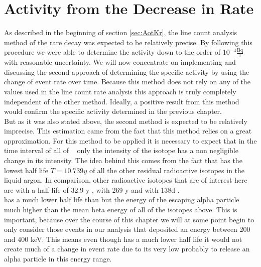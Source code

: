\documentclass[encoding=utf8,british]{tumphthesis}
\begin{document}
\chapter{Activity from the Decrease in Rate}
\label{sec:SAfromDecrease}

As described in the beginning of section \ref{sec:AotKr}, the line count analysis method of the rare \Kr decay was expected to be relatively precise.
By following this procedure we were able to determine the activity down to the order of 10$^{-4} \frac{\mathrm{Bq}}{\mathrm{l}}$ with reasonable uncertainty.
We will now concentrate on implementing and discussing the second approach of determining the specific activity by using the change of event rate over time.
Because this method does not rely on any of the values used in the line count rate analysis this approach is truly completely independent of the other method.
Ideally, a positive result from this method would confirm the specific activity determined in the previous chapter. 
\\

But as it was also stated above, the second method is expected to be relatively imprecise.  
This estimation came from the fact that this method relies on a great approximation.
For this method to be applied it is necessary to expect that in the time interval of all of \PII~ only the intensity of the \Kr isotope has a non negligible change in its intensity.
The idea behind this comes from the fact that \Kr has the lowest half life \(T = 10.739\unit{y}\) of all the other residual radioactive isotopes in the liquid argon.
In comparison, other radioactive isotopes that are of interest here are  with a half-life of 32.9 y \cite{chen_nuclear_2016},  with 269 y \cite{singh_nuclear_2006} and  with 138d \cite{kondev_nuclear_2008}. 
\\

 has a much lower half life than \Kr but the energy of the escaping alpha particle much higher than the mean beta energy of all of the isotopes above.
This is important, because over the course of this chapter we will at some point begin to only consider those events in our analysis that deposited an energy between 200 and 400 keV.   
This means even though  has a much lower half life it would not create much of a change in event rate due to its very low probably to release an alpha particle in this energy range.
\\
\end{document}
